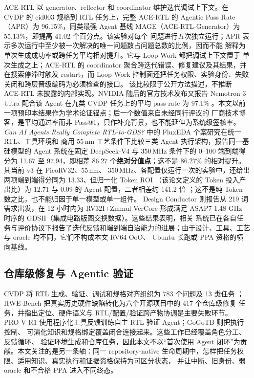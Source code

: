 \documentclass[UTF8,a4paper,zihao=-4,oneside]{ctexart}
\begin{document}
ACE-RTL 以 generator、reflector 和 coordinator 维护迭代调试上下文。在 CVDP 的 cid003 规格到 RTL
任务上，完整 ACE-RTL 的 Agentic Pass Rate（APR）为 96.15\%，同类最强 Agent 基线
MAGE（ACE-RTL-Generator）为 55.13\%，即提高 41.02 个百分点\cite{deng2026acertl}。该实验对每个
问题进行五次独立运行；APR 表示多次运行中至少被一次解决的唯一问题数占问题总数的比例，因而不能
解释为单次生成成功率或跨任务平均相对提升。它与 Loop-Work 都把调试上下文置于
单次生成之上；ACE-RTL 的 coordinator 聚合跨迭代错误、修复建议及其结果，并在搜索停滞时触发
restart，而 Loop-Work 控制面还把任务权限、实验身份、失败关闭和跨层晋级编码为必须检查的接口。
该比较限于公开方法描述，不推断 ACE-RTL 未披露的内部实现。NVIDIA 随后的官方技术发布又报告
Nemotron 3 Ultra 配合该 Agent 在九类 CVDP 任务上的平均 pass rate 为 97.1\%
\cite{nvidia2026acertl}。本文以前一项预印本结果作为学术论证锚点；后一个数值来自未经同行评议的
厂商技术博客，是平均通过率而非 Pass@1，只作补充背景，也不能延伸为系统级签核率。
\emph{Can AI Agents Really Complete RTL-to-GDS?} 中的 FluxEDA 个案研究在统一 RTL、工具环境和
商用 55\,nm 工艺条件下比较三类 Agent 执行架构，报告同一基础模型的 Agent 系统在固定 DeepSeek-V4
与 350\,MHz 条件下的 0--100 端到端得分为 11.67 至 97.94，即相差
86.27 个\textbf{绝对分值点}；这不是 86.27\% 的相对提升。其当前 v3 在 PicoRV32、55\,nm、
350\,MHz、各配置仅运行一次的实验中，还给出两项端到端得分同为 13.33、但归一化 Token ROI
（该论文定义的 Token 投入产出比）为
12.71 与 0.09 的 Agent 配置，二者相差约 141.2 倍
\cite{deng2026fluxbench}；这不是纯 Token 数之比，也不能归因于单一模型或单一组件。
Design Conductor 则报告从 219 词需求出发，在 12 小时内为 RV32I+Zmmul
VerCore 形成满足 ASAP7 1.48 GHz 时序的 GDSII（集成电路版图交换数据）\cite{verkor2026designconductor}。这些结果表明，相关
系统已在各自任务与评价协议下报告了迭代反馈和端到端自治能力的进展；由于设计、工具、工艺与
oracle 均不同，它们不构成本文 RV64 OoO、
Ubuntu 长跑或 PPA 资格的横向基线。

\subsection{仓库级修复与 Agentic 验证}

CVDP 将 RTL 生成、验证、调试和规格对齐组织为 783 个问题及 13 类任务
\cite{pinckney2025cvdp}；HWE-Bench 把真实历史硬件缺陷转化为六个开源项目中的 417 个仓库级修复
任务，并指出定位、硬件语义与 RTL/配置/验证跨产物协调是主要失败环节\cite{cui2026hwebench}。
PRO-V-R1 使用程序化工具反馈训练自主 RTL 验证 Agent\cite{zhao2025prov}；GoGoTB 则把执行控制、
可演化知识和规格绑定覆盖闭合连接起来\cite{xin2026gogotb}。这些工作已经覆盖角色分工、反馈循环、
验证环境生成和仓库任务，因此本文不以“首次使用 Agent 闭环”为贡献。本文关注的是另一条轴：同一
repository-native 生命周期中，怎样把任务权限、适用知识、真实执行和证据资格保持为可区分状态，
并让中断、旧身份、弱 oracle 和不合格 PPA 进入不同终态。
\end{document}
